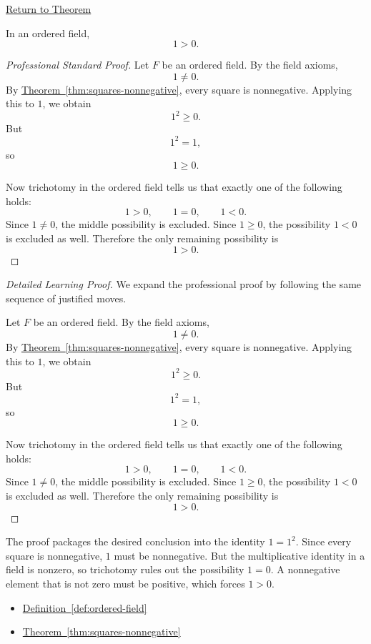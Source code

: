 \newpage
{}
\label{prf:one-positive}

\begin{remark*}[Return]
\hyperref[thm:one-positive]{Return to Theorem}
\end{remark*}

\begin{theorem*}[$1$ Is Positive]
In an ordered field,
\[
1>0.
\]
\end{theorem*}

\begin{proof}[Professional Standard Proof]
\LRAProofBodyStart
Let $F$ be an ordered field.  By the field axioms,
\[
1\neq 0.
\]
By \hyperref[thm:squares-nonnegative]{Theorem~\ref*{thm:squares-nonnegative}},
every square is nonnegative.  Applying this to $1$, we obtain
\[
1^2\ge 0.
\]
But
\[
1^2=1,
\]
so
\[
1\ge 0.
\]

Now trichotomy in the ordered field tells us that exactly one of the
following holds:
\[
1>0,\qquad 1=0,\qquad 1<0.
\]
Since $1\neq 0$, the middle possibility is excluded.  Since $1\ge 0$, the
possibility $1<0$ is excluded as well.  Therefore the only remaining
possibility is
\[
1>0.
\]
\end{proof}

\begin{proof}[Detailed Learning Proof]
\LRAProofBodyStart
We expand the professional proof by following the same sequence of justified moves.

Let $F$ be an ordered field.  By the field axioms,
\[
1\neq 0.
\]
By \hyperref[thm:squares-nonnegative]{Theorem~\ref*{thm:squares-nonnegative}},
every square is nonnegative.  Applying this to $1$, we obtain
\[
1^2\ge 0.
\]
But
\[
1^2=1,
\]
so
\[
1\ge 0.
\]

Now trichotomy in the ordered field tells us that exactly one of the
following holds:
\[
1>0,\qquad 1=0,\qquad 1<0.
\]
Since $1\neq 0$, the middle possibility is excluded.  Since $1\ge 0$, the
possibility $1<0$ is excluded as well.  Therefore the only remaining
possibility is
\[
1>0.
\]
\end{proof}

\begin{remark*}
The proof packages the desired conclusion into the identity $1=1^2$.  Since
every square is nonnegative, $1$ must be nonnegative.  But the multiplicative
identity in a field is nonzero, so trichotomy rules out the possibility
$1=0$.  A nonnegative element that is not zero must be positive, which
forces $1>0$.
\end{remark*}

\begin{dependencies}
\begin{itemize}
  \item \hyperref[def:ordered-field]{Definition~\ref*{def:ordered-field}}
  \item \hyperref[thm:squares-nonnegative]{Theorem~\ref*{thm:squares-nonnegative}}
\end{itemize}
\end{dependencies}

\clearpage
